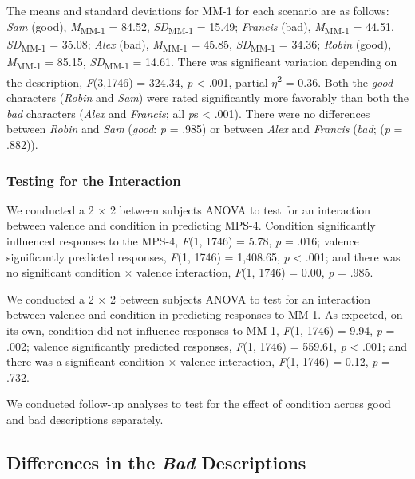 \documentclass[
  english,
  man,floatsintext]{apa7}
\begin{document}
The means and standard deviations for MM-1 for each scenario are as follows:
\emph{Sam} (good),
\emph{M}\textsubscript{MM-1} = 84.52, \emph{SD}\textsubscript{MM-1} = 15.49;
\emph{Francis} (bad),
\emph{M}\textsubscript{MM-1} = 44.51, \emph{SD}\textsubscript{MM-1} = 35.08;
\emph{Alex} (bad),
\emph{M}\textsubscript{MM-1} = 45.85, \emph{SD}\textsubscript{MM-1} = 34.36;
\emph{Robin} (good),
\emph{M}\textsubscript{MM-1} = 85.15, \emph{SD}\textsubscript{MM-1} = 14.61. There was significant variation depending on the description, \emph{F}(3,1746) = 324.34, \emph{p} \textless{} .001, partial \(\eta\)\textsuperscript{2} = 0.36. Both the \emph{good} characters (\emph{Robin} and \emph{Sam}) were rated significantly more favorably than both the \emph{bad} characters (\emph{Alex} and \emph{Francis}; all \emph{p}s \textless{} .001). There were no differences between \emph{Robin} and \emph{Sam} (\emph{good}: \emph{p} = .985) or between \emph{Alex} and \emph{Francis} (\emph{bad}; (\emph{p} = .882)).

\hypertarget{testing-for-the-interaction}{%
\subsubsection{Testing for the Interaction}\label{testing-for-the-interaction}}

We conducted a 2 \(\times\) 2 between subjects ANOVA to test for an interaction between valence and condition in predicting MPS-4.
Condition significantly influenced responses to the MPS-4,
\emph{F}(1, 1746) = 5.78, \emph{p} = .016;
valence significantly predicted responses,
\emph{F}(1, 1746) = 1,408.65, \emph{p} \textless{} .001;
and there was no significant condition \(\times\) valence interaction,
\emph{F}(1, 1746) = 0.00, \emph{p} = .985.

We conducted a 2 \(\times\) 2 between subjects ANOVA to test for an interaction between valence and condition in predicting responses to MM-1.
As expected, on its own, condition did not influence responses to MM-1,
\emph{F}(1, 1746) = 9.94, \emph{p} = .002;
valence significantly predicted responses,
\emph{F}(1, 1746) = 559.61, \emph{p} \textless{} .001;
and there was a significant condition \(\times\) valence interaction,
\emph{F}(1, 1746) = 0.12, \emph{p} = .732.

We conducted follow-up analyses to test for the effect of condition across good and bad descriptions separately.

\hypertarget{differences-in-the-bad-descriptions-1}{%
\subsection{\texorpdfstring{Differences in the \emph{Bad} Descriptions}{Differences in the Bad Descriptions}}\label{differences-in-the-bad-descriptions-1}}
\end{document}
